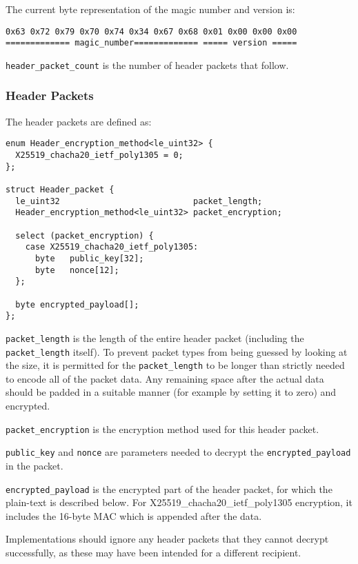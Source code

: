 \documentclass[10pt]{article}
\newcommand{\kw}[1]{\texttt{#1}}
\begin{document}
The current byte representation of the magic number and version is:
\begin{verbatim}
0x63 0x72 0x79 0x70 0x74 0x34 0x67 0x68 0x01 0x00 0x00 0x00
============= magic_number============= ===== version =====
\end{verbatim}

\kw{header\_packet\_count} is the number of header packets that follow.

\subsubsection{Header Packets}\label{header:encryption}

The header packets are defined as:

\begin{verbatim}
enum Header_encryption_method<le_uint32> {
  X25519_chacha20_ietf_poly1305 = 0;
};

struct Header_packet {
  le_uint32                           packet_length;
  Header_encryption_method<le_uint32> packet_encryption;

  select (packet_encryption) {
    case X25519_chacha20_ietf_poly1305:
      byte   public_key[32];
      byte   nonce[12];
  };

  byte encrypted_payload[];
};
\end{verbatim}

\kw{packet\_length} is the length of the entire header packet (including the \kw{packet\_length} itself).
To prevent packet types from being guessed by looking at the size, it is permitted for the \kw{packet\_length} to be
longer than strictly needed to encode all of the packet data.
Any remaining space after the actual data should be padded in a suitable manner (for example by setting it to zero)
and encrypted.

\kw{packet\_encryption} is the encryption method used for this header packet.

\kw{public\_key} and \kw{nonce} are parameters needed to decrypt the \kw{encrypted\_payload} in the packet.

\kw{encrypted\_payload} is the encrypted part of the header packet, for which the plain-text is described below.
For X25519\_chacha20\_ietf\_poly1305 encryption, it includes the 16-byte MAC which is appended after the data.

Implementations should ignore any header packets that they cannot decrypt successfully, as these may have
been intended for a different recipient.
\end{document}
